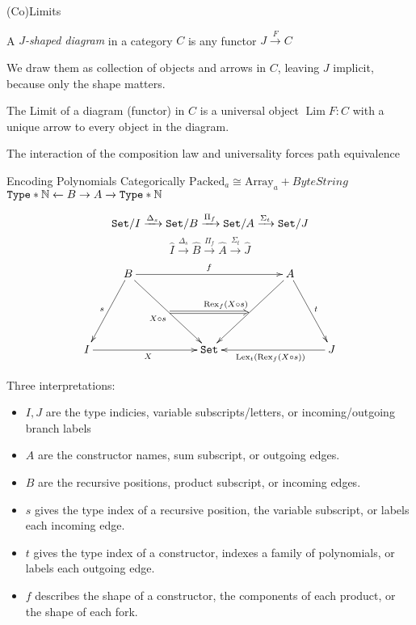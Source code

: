 \documentclass{beamer}
\newcommand{\NN}{\mathbb{N}}
\newcommand{\Set}{{\tt Set }}
\newcommand{\Type}{{\tt Type }}
\begin{document}
\begin{frame}{(Co)Limits}
\begin{definition}[Diagrams]
A \emph{$J$-shaped diagram} in a category $C$ is any functor $J \xrightarrow{F} C$\\
\end{definition}
We draw them as collection of objects and arrows in $C$, leaving $J$ implicit, because only the shape matters.
\pause
\begin{definition}[(Co)Limit]
The Limit of a diagram (functor) in $C$ is a universal object $\operatorname{Lim} F : C$ with a unique arrow to every object in the diagram.
\end{definition}
The interaction of the composition law and universality forces path equivalence
\end{frame}
 
 

\begin{frame}{Encoding Polynomials Categorically}
$\mbox{Packed}_a \cong \mbox{Array}_a + ByteString$\\
$\Type * \NN \xleftarrow{} B \to A \xrightarrow{} \Type * \NN$

\pause

\[\Set / I \xrightarrow{\Delta_s} \Set / B \xrightarrow{\Pi_f} \Set / A \xrightarrow{\Sigma_t} \Set / J\]
\[\hat I \xrightarrow{\Delta_s} \hat B \xrightarrow{\Pi_f} \hat A \xrightarrow{\Sigma_t} \hat J\]
\[
 \xymatrix{
 & B \ar[ddrr]_{X \circ s} \ar[ddl]_{s} \ar[rrrr]^{f} & & & & A \ar[ddll]_{\operatorname{Rex}_f (X \circ s)} \ar[ddr]^{t} & \\
 & & \ar@{=>}[rr] & & & &  \\
 I \ar[rrr]_{X} & & & \Set & & & J \ar[lll]^{\operatorname{Lex}_t (\operatorname{Rex}_f (X \circ s))}  }
 \]
 
Three interpretations:
\begin{itemize}
\item $I,J$ are the type indicies, variable subscripts/letters, or incoming/outgoing branch labels
\item $A$ are the constructor names, sum subscript, or outgoing edges.
\item $B$ are the recursive positions, product subscript, or incoming edges.
\pause
\item $s$ gives the type index of a recursive position, the variable subscript, or labels each incoming edge.
\item $t$ gives the type index of a constructor, indexes a family of polynomials, or labels each outgoing edge.
\item $f$ describes the shape of a constructor, the components of each product, or the shape of each fork.
\end{itemize}
\end{frame}
\end{document}
